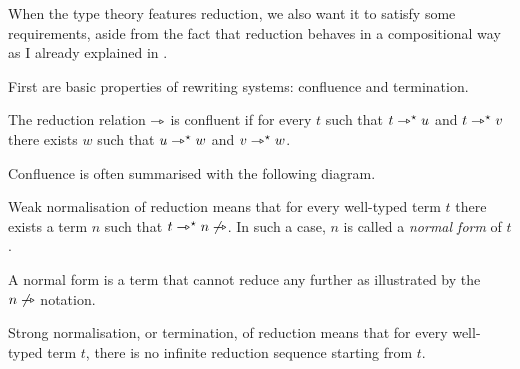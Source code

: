 When the type theory features reduction, we also want it to satisfy some
requirements, aside from the fact that reduction behaves in a compositional way
as I already explained in .

First are basic properties of rewriting systems: confluence and termination.

\begin{definition}[Confluence]
  The reduction relation \(\rightarrowtriangle\) is confluent if for every \(t\) such that
  \(t \rightarrowtriangle^{\star} u\) and \(t \rightarrowtriangle^{\star} v\) there exists \(w\) such that \(u \rightarrowtriangle^{\star} w\)
  and \(v \rightarrowtriangle^{\star} w\).
\end{definition}

Confluence is often summarised with the following diagram.

\begin{center}
\end{center}

\begin{definition}
  Weak normalisation of reduction means that for every well-typed term \(t\)
  there exists a term \(n\) such that \(t \rightarrowtriangle^{\star} n \not\rightarrowtriangle\).
  In such a case, \(n\) is called a \emph{normal form} of \(t\).
\end{definition}

A normal form is a term that cannot reduce any further as illustrated by the
\(n \not\rightarrowtriangle\) notation.

\begin{definition}
  Strong normalisation, or termination, of reduction means that for every
  well-typed term \(t\), there is no infinite reduction sequence starting from
  \(t\).
\end{definition}

